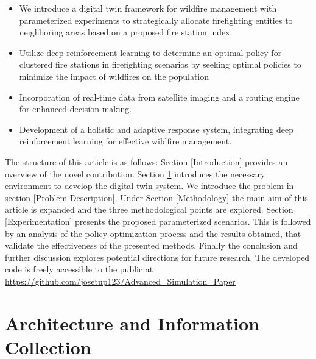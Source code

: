 \documentclass[lettersize,journal]{IEEEtran}
\begin{document}
\begin{itemize}
    \item We introduce a digital twin framework for wildfire management with parameterized experiments to strategically allocate firefighting entities to neighboring areas based on a proposed fire station index.

    \item Utilize deep reinforcement learning to determine an optimal policy for clustered fire stations in firefighting scenarios by seeking optimal policies to minimize the impact of wildfires on the population

    \item Incorporation of real-time data from satellite imaging and a routing engine for enhanced decision-making.
    
    \item Development of a holistic and adaptive response system, integrating deep reinforcement learning for effective wildfire management.
    



    
\end{itemize}


The structure of this article is as follows: Section \ref{Introduction} provides an overview of the novel contribution. Section \ref{Architecture and Information Collection} introduces the necessary environment to develop the digital twin system. We introduce the problem in section \ref{Problem Description}. Under Section \ref{Methodology} the main aim of this article is expanded and the three methodological points are explored. Section \ref{Experimentation} presents the proposed parameterized scenarios. This is followed by an analysis of the policy optimization process and the results obtained, that validate the effectiveness of the presented methods. Finally the conclusion and further discussion explores potential directions for future research. The developed code is freely accessible to the public at \url{https://github.com/josetup123/Advanced_Simulation_Paper}

\section{Architecture and Information Collection}\label{Architecture and Information Collection}
  
\end{document}
